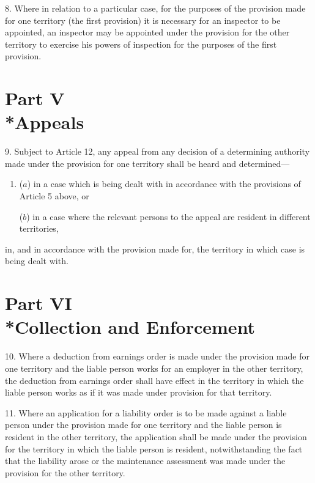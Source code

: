 \documentclass[12pt,a4paper]{article}
\begin{document}

\medskip

8.  Where in relation to a particular case, for the purposes of the provision made for one territory (the first provision) it is necessary for an inspector to be appointed, an inspector may be appointed under the provision for the other territory to exercise his powers of inspection for the purposes of the first provision.

\section[Part V --- Appeals]{Part V\\*Appeals}

\renewcommand\parthead{--- Schedule 1 Part V}

9.  Subject to Article 12, any appeal from any decision of a determining authority made under the provision for one territory shall be heard and determined—
\begin{enumerate}\item[]
($a$) in a case which is being dealt with in accordance with the provisions of Article 5 above, or

($b$) in a case where the relevant persons to the appeal are resident in different territories,
\end{enumerate}
in, and in accordance with the provision made for, the territory in which case is being dealt with.

\section[Part VI --- Collection and Enforcement]{Part VI\\*Collection and Enforcement}

\renewcommand\parthead{--- Schedule 1 Part VI}

10.   Where a deduction from earnings order is made under the provision made for one territory and the liable person works for an employer in the other territory, the deduction from earnings order shall have effect in the territory in which the liable person works as if it was made under provision for that territory.

\medskip

11.   Where an application for a liability order is to be made against a liable person under the provision made for one territory and the liable person is resident in the other territory, the application shall be made under the provision for the territory in which the liable person is resident, notwithstanding the fact that the liability arose or the maintenance assessment was made under the provision for the other territory.
\end{document}
